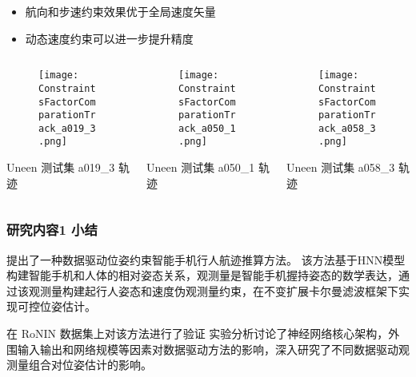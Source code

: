 \begin{frame}
\begin{columns}[t]
\begin{column}{0.5\textwidth}
		\vspace{-0.5cm}
		{
		   	\small
			\begin{itemize}
				\item 航向和步速约束效果优于全局速度矢量
				\item 动态速度约束可以进一步提升精度
			\end{itemize}
		 }
		\end{column}    
	\end{columns}
	\begin{columns}[t]
		\begin{column}{0.3\textwidth}
		   	\begin{figure}
    			\texttt{[image: ConstraintsFactorComparationTrack\_a019\_3.png]}
		   	\end{figure}
		   	\vspace{-0.5cm}
		   	\hspace{1.2cm} {\tiny Uneen 测试集 a019\_3 轨迹}
		\end{column}   
		\begin{column}{0.3\textwidth}
		   	\begin{figure}
    			\texttt{[image: ConstraintsFactorComparationTrack\_a050\_1.png]}
		   	\end{figure}
		   	\vspace{-0.5cm}
		   	\hspace{1.2cm} {\tiny Uneen 测试集 a050\_1 轨迹}
		\end{column}  
		\begin{column}{0.3\textwidth}
		   	\begin{figure}
    			\texttt{[image: ConstraintsFactorComparationTrack\_a058\_3.png]}
		   	\end{figure}
		   	\vspace{-0.5cm}
		   	\hspace{1.2cm} {\tiny Uneen 测试集 a058\_3 轨迹}
		\end{column}
	\end{columns} 	
\end{frame}

\begin{frame}
	\frametitle{研究内容1 小结}
		\begin{block}{提出了一种数据驱动位姿约束智能手机行人航迹推算方法。}
		{   
		    \footnotesize
		    该方法基于HNN模型构建智能手机和人体的相对姿态关系，观测量是智能手机握持姿态的数学表达，通过该观测量构建起行人姿态和速度伪观测量约束，在不变扩展卡尔曼滤波框架下实现可控位姿估计。
		} 
		\end{block}		
		\begin{block}{在 RoNIN 数据集上对该方法进行了验证}
		{
		    \footnotesize
		    实验分析讨论了神经网络核心架构，外围输入输出和网络规模等因素对数据驱动方法的影响，深入研究了不同数据驱动观测量组合对位姿估计的影响。 
		} 
		\end{block}
\end{frame}

